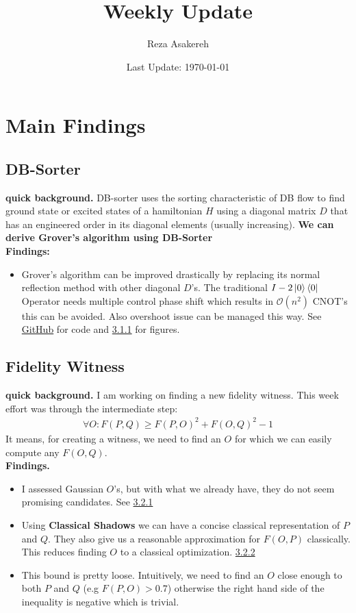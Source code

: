 \documentclass[11pt]{article}
\title{Weekly Update}
\author{Reza Asakereh}
\date{Last Update: \today}
\begin{document}
\maketitle

\section{Main Findings}
\subsection{DB-Sorter}
\textbf{quick background.} DB-sorter uses the sorting characteristic of DB flow to find ground state or excited states of a hamiltonian $H$ using a diagonal matrix $D$ that has an engineered order in its diagonal elements (usually increasing). \textbf{We can derive Grover's algorithm using DB-Sorter}
\\

\textbf{Findings:}
\begin{itemize}
    \item Grover's algorithm can be improved drastically by replacing its normal reflection method with other diagonal $D$'s. The traditional $I - 2\ket{0}\bra{0}$ Operator needs multiple control phase shift which results in $\mathcal{O}(n^2)$ CNOT's this can be avoided. Also overshoot issue can be managed this way. See \href{https://github.com/rasakereh/double-bracket-algo/blob/master/examples/grover.py}{GitHub} for code and \hyperref[sec:grover]{3.1.1} for figures.
\end{itemize}

\subsection{Fidelity Witness}
\textbf{quick background.} I am working on finding a new fidelity witness. This week effort was through the intermediate step:
\begin{align}
\forall O:  F(P, Q) \ge F(P, O)^2 + F(O, Q)^2 - 1
\label{eq:fidelity-ineq}
\end{align}
It means, for creating a witness, we need to find an $O$ for which we can easily compute any $F(O, Q)$.
\\

\textbf{Findings.}
\begin{itemize}
    \item I assessed Gaussian $O$'s, but with what we already have, they do not seem promising candidates. See \hyperref[sec:gaussian-fidelity]{3.2.1}
    \item Using \textbf{Classical Shadows} we can have a concise classical representation of $P$ and $Q$. They also give us a reasonable approximation for $F(O, P)$ classically. This reduces finding $O$ to a classical optimization. \hyperref[sec:classical-shadow]{3.2.2}
    \item This bound is pretty loose. Intuitively, we need to find an $O$ close enough to both $P$ and $Q$ (e.g $F(P, O) > 0.7$) otherwise the right hand side of the inequality is negative which is trivial.
\end{itemize}
\end{document}
